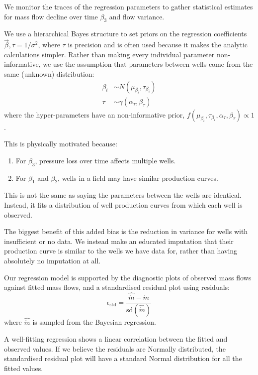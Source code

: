 \documentclass[a4paper, 12pt]{article}
\begin{document}
We monitor the traces of the regression parameters to gather statistical estimates for mass flow decline over time $\beta_3$ and flow variance.

We use a hierarchical Bayes structure to set priors on the regression coefficients $\vec{\beta},\tau=1/\sigma^2$, where $\tau$ is precision and is often used because it makes the analytic calculations simpler. Rather than making every individual parameter non-informative, we use the assumption that parameters between wells come from the same (unknown) distribution:
\begin{align}
\beta_i &\sim N\left( \mu_{\beta_i},\tau_{\beta_i} \right)\\
\tau &\sim \gamma\left(\alpha_\tau,\beta_\tau\right)
\end{align}
where the hyper-parameters have an non-informative prior, $f\left(\mu_{\beta_i},\tau_{\beta_i},\alpha_\tau,\beta_\tau\right) \propto 1$.
 
This is physically motivated because:

\begin{enumerate}
\item For $\beta_3$, pressure loss over time affects multiple wells.
\item For $\beta_1$ and $\beta_2$, wells in a field may have similar production curves.
\end{enumerate}

This is not the same as saying the parameters between the wells are identical. Instead, it fits a distribution of well production curves from which each well is observed.

The biggest benefit of this added bias is the reduction in variance for wells with insufficient or no data. We instead make an educated imputation that their production curve is similar to the wells we have data for, rather than having absolutely no imputation at all.

Our regression model is supported by the diagnostic plots of observed mass flows against fitted mass flows, and a standardised residual plot using residuals:
\begin{equation}
\epsilon_\text{std} = \frac{\hat{\dot{m}} - \dot{m}}{\text{sd}\left( \hat{\dot{m}} \right)}
\end{equation}
where $\hat{\dot{m}}$ is sampled from the Bayesian regression.

A well-fitting regression shows a linear correlation between the fitted and observed values. If we believe the residuals are Normally distributed, the standardised residual plot will have a standard Normal distribution for all the fitted values. 
\end{document}
